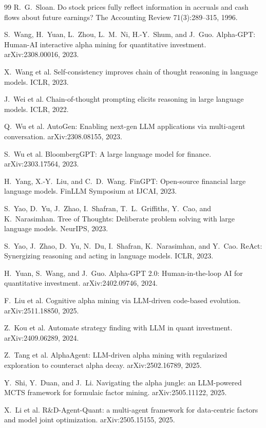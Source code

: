 \documentclass{article}
\theoremstyle{definition}
\theoremstyle{plain}
\theoremstyle{remark}
\begin{document}
\begin{thebibliography}{99}
 R.~G.~Sloan. Do stock prices fully reflect information in accruals
and cash flows about future earnings? The Accounting Review 71(3):289--315, 1996.

 S.~Wang, H.~Yuan, L.~Zhou, L.~M.~Ni, H.-Y.~Shum, and J.~Guo.
Alpha-GPT: Human-AI interactive alpha mining for quantitative investment.
arXiv:2308.00016, 2023.

 X.~Wang et al. Self-consistency improves chain of thought
reasoning in language models. ICLR, 2023.

 J.~Wei et al. Chain-of-thought prompting elicits reasoning in large
language models. ICLR, 2022.

 Q.~Wu et al. AutoGen: Enabling next-gen LLM applications via
multi-agent conversation. arXiv:2308.08155, 2023.

 S.~Wu et al. BloombergGPT: A large language model for finance.
arXiv:2303.17564, 2023.

 H.~Yang, X.-Y.~Liu, and C.~D.~Wang. FinGPT: Open-source financial
large language models. FinLLM Symposium at IJCAI, 2023.

 S.~Yao, D.~Yu, J.~Zhao, I.~Shafran, T.~L.~Griffiths, Y.~Cao, and
K.~Narasimhan. Tree of Thoughts: Deliberate problem solving with large language
models. NeurIPS, 2023.

 S.~Yao, J.~Zhao, D.~Yu, N.~Du, I.~Shafran, K.~Narasimhan, and Y.~Cao.
ReAct: Synergizing reasoning and acting in language models. ICLR, 2023.

 H.~Yuan, S.~Wang, and J.~Guo. Alpha-GPT 2.0: Human-in-the-loop AI
for quantitative investment. arXiv:2402.09746, 2024.

 F.~Liu et al. Cognitive alpha mining via LLM-driven code-based
evolution. arXiv:2511.18850, 2025.

 Z.~Kou et al. Automate strategy finding with LLM in quant
investment. arXiv:2409.06289, 2024.

 Z.~Tang et al. AlphaAgent: LLM-driven alpha mining with
regularized exploration to counteract alpha decay. arXiv:2502.16789, 2025.

 Y.~Shi, Y.~Duan, and J.~Li. Navigating the alpha jungle: an
LLM-powered MCTS framework for formulaic factor mining. arXiv:2505.11122, 2025.

 X.~Li et al. R\&D-Agent-Quant: a multi-agent framework for
data-centric factors and model joint optimization. arXiv:2505.15155, 2025.


\end{thebibliography}
\end{document}
